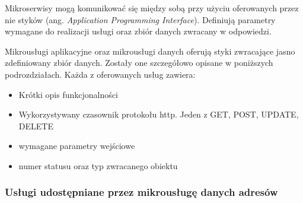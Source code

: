 Mikroserwisy mogą komunikować się między sobą przy użyciu oferowanych przez nie 
styków (ang. \textit{Application Programming Interface}). Definiują parametry wymagane 
do realizacji usługi oraz zbiór danych zwracany w odpowiedzi.

Mikrousługi aplikacyjne oraz mikrousługi danych oferują styki zwracające jasno 
zdefiniowany zbiór danych. Zostały one szczegółowo opisane w poniższych podrozdziałach. 
Każda z oferowanych usług zawiera:

\begin{itemize} %
    \item Krótki opis funkcjonalności
    \item Wykorzystywany czasownik protokołu http. Jeden z GET, POST, UPDATE, DELETE
    \item wymagane parametry wejściowe
    \item numer statusu oraz typ zwracanego obiektu
\end{itemize}

\subsubsection{Usługi udostępniane przez mikrousługę danych adresów}

